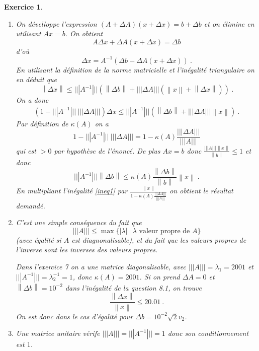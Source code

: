 \documentclass[10pt,a4paper]{article}
\newcommand{\norm}[1]{{\left\|{#1}\right\|}}
\newcommand{\abs}[1]{{\left|{#1}\right|}}
\newtheorem{exer}{Exercice}
\def\bexer{\begin{exer}\begin{em}}\def\eexer{\end{em}\end{exer}}
\begin{document}
\bexer 
\begin{enumerate}
\item On dévelloppe l'expression $(A+\Delta A) (x+\Delta x)=b+\Delta b$ et on élimine en utilisant $Ax=b$. On obtient 
\[
A \Delta x+\Delta A(x+\Delta x)=\Delta b
\]
d'où
\[
\Delta x=A^{-1} \left(\Delta b-\Delta A (x+\Delta x)\right)~.
\]
En utilisant la définition de la norme matricielle et l'inégalité triangulaire on en déduit que
\[
\norm{\Delta x} \leq ||| A^{-1} ||| \left(\norm{\Delta b}+|||\Delta A|||(\norm{x}+\norm{\Delta x}) \right)~.
\]
On a donc
\begin{align}\label{ineq1}
\left(1-|||A^{-1}|||~ |||\Delta A|||\right) \Delta x\leq ||| A^{-1} ||| \left(\norm{\Delta b}+|||\Delta A|||\norm{x}\right)~.
\end{align}
Par définition de $\kappa(A)$ on a 
\[
1-|||A^{-1}|||~ |||\Delta A|||=1-\kappa(A) \frac{|||\Delta A|||}{|||A|||}
\]
qui est $>0$ par hypothèse de l'énoncé. De plus $Ax=b$ donc $\frac{|||A||| \norm{x}}{\norm{b}}\leq 1$ et donc
\[
|||A^{-1}||| \norm{\Delta b}\leq \kappa(A)\frac{\norm{\Delta b}}{\norm{b}} \norm{x}~.
\]
En multipliant l'inégalité \eqref{ineq1} par $\frac{\norm{x}}{1-\kappa(A) \frac{|||\Delta A|||}{|||A|||}}$ on obtient le résultat demandé.
\item C'est une simple conséquence du fait que 
\[
||| A |||\leq \max \{ \abs{\lambda}~|~\lambda \text{ valeur propre de } A\}
\]
(avec égalité si $A$ est diagnonalisable), et du fait que les valeurs propres de l'inverse sont les inverses des valeurs propres. 

Dans l'exercice 7 on a une matrice diagonalisable, avec $|||A|||=\lambda_1=2001$ et $|||A^{-1}|||=\lambda_2^{-1}=1$, donc $\kappa(A)=2001$. Si on prend $\Delta A=0$ et $\norm{\Delta b}=10^{-2}$ dans l'inégalité de la question 8.1, on trouve
\[
\frac{\norm{\Delta x}}{\norm{x}}\leq 20.01~.
\]
On est donc dans le cas d'égalité pour $\Delta b=10^{-2} \sqrt{2} v_2$. 
\item Une matrice unitaire vérife $|||A|||=|||A^{-1}|||=1$ donc son conditionnement est $1$.
\end{enumerate}

\eexer
\end{document}

